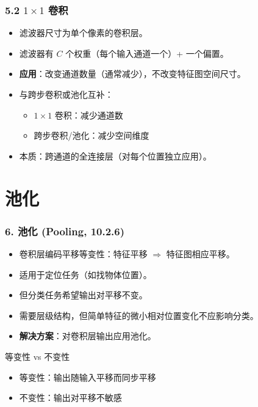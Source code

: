 \documentclass[t,aspectratio=169]{beamer} %
\begin{document}
\begin{frame}
    \frametitle{5.2 $1 \times 1$ 卷积}
    \begin{itemize}
        \item 滤波器尺寸为\alert{单个像素}的卷积层。
        \item 滤波器有 $C$ 个权重（每个输入通道一个）+ 一个偏置。
        \item \textbf{应用}：改变通道数量（通常减少），\alert{不改变特征图空间尺寸}。
        \item 与跨步卷积或池化\alert{互补}：
        \begin{itemize}
            \item $1 \times 1$ 卷积：减少\alert{通道数}
            \item 跨步卷积/池化：减少\alert{空间维度}
        \end{itemize}
        \item 本质：跨通道的全连接层（对每个位置独立应用）。
    \end{itemize}
\end{frame}

\section{池化}

\begin{frame}
    \frametitle{6. 池化 (Pooling, 10.2.6)}
    \begin{itemize}
        \item 卷积层编码\alert{平移等变性}：特征平移 $\Rightarrow$ 特征图相应平移。
        \item 适用于\alert{定位}任务（如找物体位置）。
        \item 但\alert{分类}任务希望输出对平移\alert{不变}。
        \item 需要层级结构，但简单特征的\alert{微小相对位置变化}不应影响分类。
        \item \textbf{解决方案}：对卷积层输出应用\alert{池化}。
    \end{itemize}
    \begin{block}{等变性 vs 不变性}
        \begin{itemize}
            \item 等变性：输出随输入平移而\alert{同步平移}
            \item 不变性：输出对平移\alert{不敏感}
        \end{itemize}
    \end{block}
\end{frame}
\end{document}
